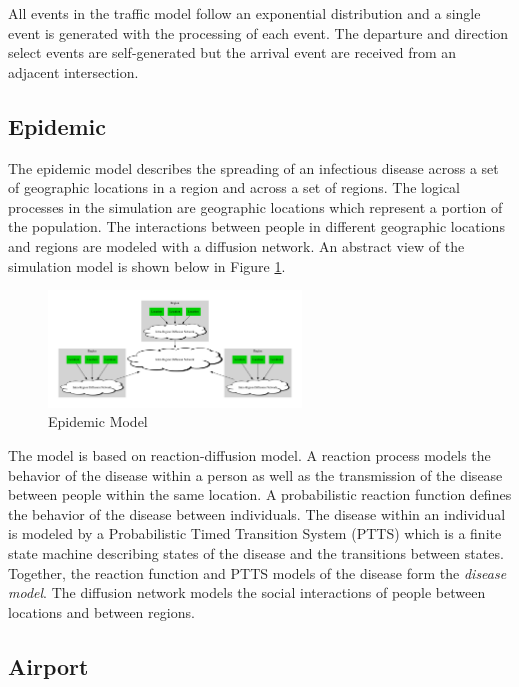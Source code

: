 \documentclass[11pt]{book}
\begin{document}
All events in the traffic model follow an exponential distribution and a single event
is generated with the processing of each event.  The departure and direction select events
are self-generated but the arrival event are received from an adjacent intersection.

\subsection{Epidemic}

The epidemic model describes the spreading of an infectious disease across a set of
geographic locations in a region and across a set of regions.  The logical processes in
the simulation are geographic locations which represent a portion of the population.  The
interactions between people in different geographic locations and regions are modeled with
a diffusion network.  An abstract view of the simulation model is shown below in Figure
\ref{epidemic_model}.

\begin{figure}
    \centering
    \includegraphics[width=0.6\textwidth,quiet]{figs/graphviz/epidemic.pdf}
    \caption{Epidemic Model}\label{epidemic_model}
\end{figure}

The model is based on reaction-diffusion model\cite{perumalla-12}.  A reaction process
models the behavior of the disease within a person as well as the transmission of the
disease between people within the same location.  A probabilistic reaction function defines
the behavior of the disease between individuals\cite{barrett-08}.  The disease within an
individual is modeled by a Probabilistic Timed Transition System (PTTS)\cite{barrett-08}
which is a finite state machine describing states of the disease and the transitions between states.
Together, the reaction function and PTTS models of the disease form the \emph{disease model}.
The diffusion network models the social interactions of people between locations and between
regions\cite{barrett-08}.

\subsection{Airport}
\end{document}
